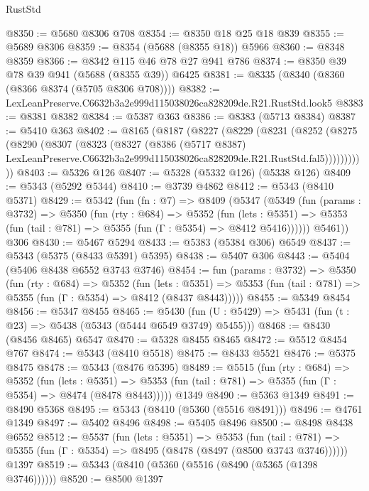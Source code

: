 \begin{lexlean}{RustStd}
\begin{coremodule}
@8350 := @5680 @8306 @708
@8354 := @8350 @18 @25 @18 @839
@8355 := @5689 @8306
@8359 := @8354 (@5688 (@8355 @18)) @5966
@8360 := @8348 @8359
@8366 := @8342 @115 @46 @78 @27 @941 @786
@8374 := @8350 @39 @78 @39 @941 (@5688 (@8355 @39)) @6425
@8381 := @8335 (@8340 (@8360 (@8366 @8374 (@5705 @8306 @708))))
@8382 := LexLeanPreserve.C6632b3a2e999d115038026ca828209de.R21.RustStd.look5
@8383 := @8381 @8382
@8384 := @5387 @363
@8386 := @8383 (@5713 @8384)
@8387 := @5410 @363
@8402 := @8165
    (@8187
      (@8227
        (@8229
          (@8231
            (@8252
              (@8275
                (@8290
                  (@8307
                    (@8323
                      (@8327
                        (@8386
                          (@5717 @8387)
                          LexLeanPreserve.C6632b3a2e999d115038026ca828209de.R21.RustStd.fal5)))))))))))
@8403 := @5326 @126
@8407 := @5328 (@5332 @126) (@5338 @126)
@8409 := @5343 (@5292 @5344)
@8410 := @3739 @4862
@8412 := @5343 (@8410 @5371)
@8429 := @5342
    (fun (fn : @7) =>
    @8409
      (@5347
        (@5349
          (fun (params : @3732) =>
          @5350
            (fun (rty : @684) =>
            @5352
              (fun (lets : @5351) =>
              @5353 (fun (tail : @781) => @5355 (fun (Γ : @5354) => @8412 @5416))))))
        @5461))
    @306
@8430 := @5467 @5294
@8433 := @5383 (@5384 @306) @6549
@8437 := @5343 (@5375 (@8433 @5391) @5395)
@8438 := @5407 @306
@8443 := @5404 (@5406 @8438 @6552 @3743 @3746)
@8454 := fun (params : @3732) =>
  @5350
    (fun (rty : @684) =>
    @5352
      (fun (lets : @5351) =>
      @5353 (fun (tail : @781) => @5355 (fun (Γ : @5354) => @8412 (@8437 @8443)))))
@8455 := @5349 @8454
@8456 := @5347 @8455
@8465 := @5430 (fun (U : @5429) => @5431 (fun (t : @23) => @5438 (@5343 (@5444 @6549 @3749) @5455)))
@8468 := @8430 (@8456 @8465) @6547
@8470 := @5328 @8455 @8465
@8472 := @5512 @8454 @767
@8474 := @5343 (@8410 @5518)
@8475 := @8433 @5521
@8476 := @5375 @8475
@8478 := @5343 (@8476 @5395)
@8489 := @5515
    (fun (rty : @684) =>
    @5352
      (fun (lets : @5351) =>
      @5353 (fun (tail : @781) => @5355 (fun (Γ : @5354) => @8474 (@8478 @8443)))))
    @1349
@8490 := @5363 @1349
@8491 := @8490 @5368
@8495 := @5343 (@8410 (@5360 (@5516 @8491)))
@8496 := @4761 @1349
@8497 := @5402 @8496
@8498 := @5405 @8496
@8500 := @8498 @8438 @6552
@8512 := @5537
    (fun (lets : @5351) =>
    @5353
      (fun (tail : @781) => @5355 (fun (Γ : @5354) => @8495 (@8478 (@8497 (@8500 @3743 @3746))))))
    @1397
@8519 := @5343 (@8410 (@5360 (@5516 (@8490 (@5365 (@1398 @3746))))))
@8520 := @8500 @1397

\end{coremodule}
\end{lexlean}
